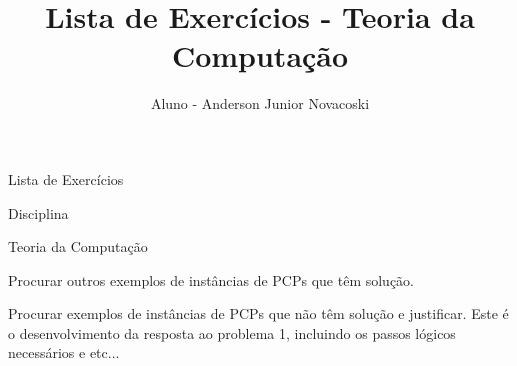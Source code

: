 \documentclass[12pt,a4paper]{article}
\author{Aluno - Anderson Junior Novacoski}
\title{Lista de Exercícios - Teoria da Computação}
\date{}
\begin{document}
	\begin{center}
    {\huge Lista de Exercícios \par}
    {\LARGE Disciplina \par}
    {\Large Teoria da Computação \par}
	\end{center}

\problem Procurar outros exemplos de instâncias de PCPs que têm solução.

\problem Procurar exemplos de instâncias de PCPs que não têm solução e justificar.
\answer Este é o desenvolvimento da resposta ao problema 1, incluindo os passos lógicos necessários e etc...
\end{document}
